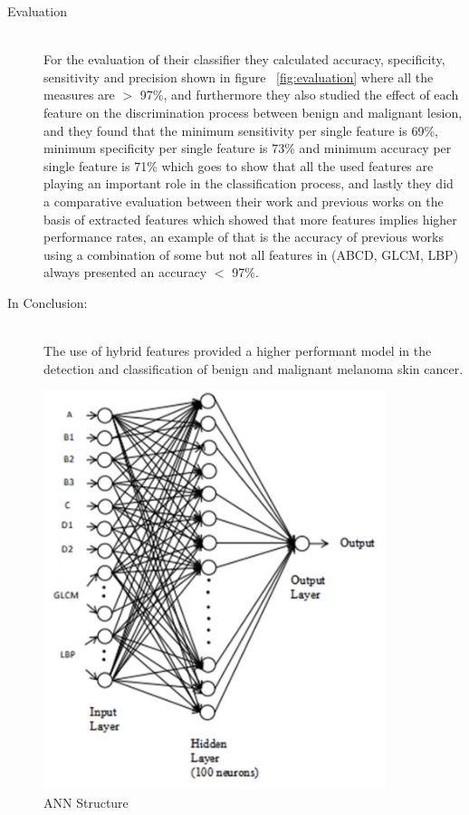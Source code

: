 \begin{description}
    \item [Evaluation] \hfill \\
        For the evaluation of their classifier they calculated accuracy, specificity, sensitivity and precision shown in figure ~\ref{fig:evaluation}  where all the measures are $>$ 97\%, and furthermore they also studied the effect of each feature on the discrimination process between benign and malignant lesion, and they found that the minimum sensitivity per single feature is 69\%, minimum specificity per single feature is 73\% and minimum accuracy per single feature is 71\% which goes to show that all the used features are playing an important role in the classification process, and lastly they did a comparative evaluation between their work and previous works on the basis of extracted features which showed that more features implies higher performance rates, an example of that is the accuracy of previous works using a combination of some but not all features in (ABCD, GLCM, LBP) always presented an accuracy $<$ 97\%.

    \item [In Conclusion: ] \hfill \\
    The use of hybrid features provided a higher performant model in the detection and classification of benign and malignant melanoma skin cancer.
    \end{description}


\begin{figure}[htbp]
\begin{center}
\includegraphics[width=10cm]{./chapter-03-state-of-the-art/ann.png}
\end{center}
\caption{ANN Structure}
\label{fig:ann}
\end{figure}


